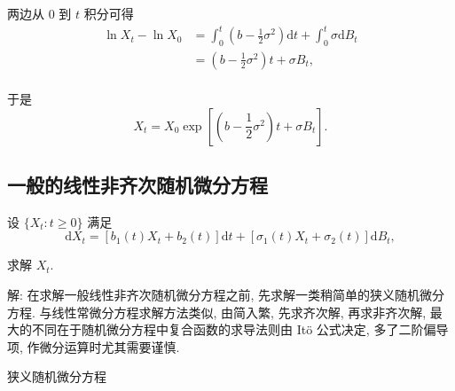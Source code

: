 \documentclass[openany]{ctexbook}
\theoremstyle{kaiti}
\theoremstyle{normal}
\begin{document}
两边从 $0$ 到 $t$ 积分可得
\begin{equation}
  \begin{aligned}
    \ln X_t-\ln X_0
    &=\int_{0}^t\left(b-\frac{1}{2}\sigma^2\right)\mathrm{d}t+\int_{0}^t\sigma\mathrm{d}B_t\\
    &=\left(b-\frac{1}{2}\sigma^2\right)t+\sigma B_t,\\
  \end{aligned}
\end{equation}

于是
\begin{equation}
  X_t=X_0\exp\left[\left(b-\frac{1}{2}\sigma^2\right)t+\sigma B_t\right].
\end{equation}

\subsection{一般的线性非齐次随机微分方程}

设 $\{X_t:t\geqslant0\}$ 满足
\begin{equation}
  \mathrm{d}X_t=[b_1(t) X_t+b_2(t)]\mathrm{d}t+[\sigma_1(t) X_t+\sigma_2(t)]\mathrm{d}B_t,
\end{equation}

求解 $X_t$.

解: 在求解一般线性非齐次随机微分方程之前, 先求解一类稍简单的狭义随机微分方程. 与线性常微分方程求解方法类似, 由简入繁, 先求齐次解, 再求非齐次解, 最大的不同在于随机微分方程中复合函数的求导法则由 It\"o 公式决定, 多了二阶偏导项, 作微分运算时尤其需要谨慎.

狭义随机微分方程
\end{document}
